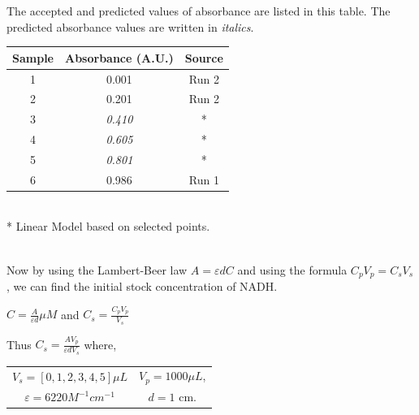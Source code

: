 \documentclass[a4paper,10pt]{article}
\begin{document}
            \begin{minipage}{0.49\textwidth}
                \vspace{-7em}
                The accepted and predicted values of absorbance are listed in this table.
                The predicted absorbance values are written in {\it italics}.\\
                
                \begin{tabular}{| c | c | c |}
                    \hline 
                    {\bfseries Sample} & {\bfseries Absorbance (A.U.)} & {\bfseries Source} \\
                    \hline 
                    \hline 
                    1 & 0.001 & Run 2 \\
                    2 & 0.201 & Run 2 \\
                    3 & {\it 0.410} & * \\
                    4 & {\it 0.605} & * \\
                    5 & {\it 0.801} & * \\
                    6 & 0.986 & Run 1 \\
                    \hline
                \end{tabular}\\

                * {\small Linear Model based on selected points.}
            \end{minipage}\\

            Now by using the Lambert-Beer law $A = \varepsilon d C$ and using the formula
            $C_p V_p = C_s V_s$, we can find the initial stock concentration of NADH.
            \begin{center}
                $ C = \frac{A}{\varepsilon d} \mu M$ and $ C_s = \frac{C_p V_p}{V_s} $
                \vspace{0.5em}
                
                Thus $ C_s = \frac{A V_p}{\varepsilon d V_s}$ where,\\
                \vspace{0.5em}

                \begin{tabular}{c c}
                    $ V_s = [0,1,2,3,4,5] \mu L $ & $ V_p = 1000 \mu L $, \\
                    $\varepsilon = 6220 M^{-1} cm^{-1}$ & $d = 1$ cm.\\
                \end{tabular}
            \end{center}
            
\end{document}
